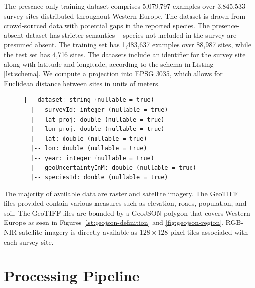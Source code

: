 The presence-only training dataset comprises 5,079,797 examples over 3,845,533 survey sites distributed throughout Western Europe.
The dataset is drawn from crowd-sourced data with potential gaps in the reported species.
The presence-absent dataset has stricter semantics -- species not included in the survey are presumed absent.
The training set has 1,483,637 examples over 88,987 sites, while the test set has 4,716 sites.
The datasets include an identifier for the survey site along with latitude and longitude, according to the schema in Listing \ref{lst:schema}.
We compute a projection into EPSG 3035, which allows for Euclidean distance between sites in units of meters. 

\begin{figure}[b]
\begin{lstlisting}[caption={
  Metadata schema for the competition.
}, captionpos=b,label={lst:schema},frame=single]
  |-- dataset: string (nullable = true)
  |-- surveyId: integer (nullable = true)
  |-- lat_proj: double (nullable = true)
  |-- lon_proj: double (nullable = true)
  |-- lat: double (nullable = true)
  |-- lon: double (nullable = true)
  |-- year: integer (nullable = true)
  |-- geoUncertaintyInM: double (nullable = true)
  |-- speciesId: double (nullable = true) 
\end{lstlisting}
\end{figure}

The majority of available data are raster and satellite imagery. 
The GeoTIFF files provided contain various measures such as elevation, roads, population, and soil. 
The GeoTIFF files are bounded by a GeoJSON polygon that covers Western Europe as seen in Figures \ref{lst:geojson-definition} and \ref{fig:geojson-region}.
RGB-NIR satellite imagery is directly available as $128\times128$ pixel tiles associated with each survey site.

\section{Processing Pipeline}


